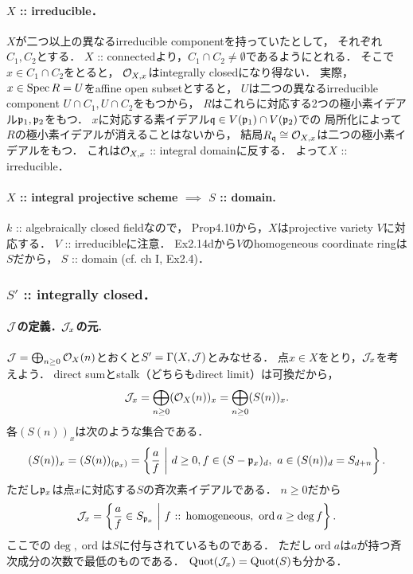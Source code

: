 \documentclass[a4paper]{jsarticle}
\newcommand{\ord}{\operatorname{ord}}
\begin{document}
    \paragraph{$X$ :: irreducible．}
    $X$が二つ以上の異なるirreducible componentを持っていたとして，
    それぞれ$C_1, C_2$とする．
    $X$ :: connectedより，$C_1 \cap C_2 \neq \emptyset$であるようにとれる．
    そこで$x \in C_1 \cap C_2$をとると，
    $\mathcal{O}_{X,x}$はintegrally closedになり得ない．
    実際，
    $x \in \operatorname{Spec} R=U$をaffine open subsetとすると，
    $U$は二つの異なるirreducible component $U \cap C_1, U \cap C_2$をもつから，
    $R$はこれらに対応する2つの極小素イデアル$\mathfrak{p}_1, \mathfrak{p}_2$をもつ．
    $x$に対応する素イデアル$\mathfrak{q} \in V(\mathfrak{p}_1) \cap V(\mathfrak{p}_2)$での
    局所化によって$R$の極小素イデアルが消えることはないから，
    結局$R_{\mathfrak{q}} \cong \mathcal{O}_{X,x}$は二つの極小素イデアルをもつ．
    これは$\mathcal{O}_{X,x}$ :: integral domainに反する．
    よって$X$ :: irreducible．

    \paragraph{$X$ :: integral projective scheme $\implies$ $S$ :: domain.}
    $k$ :: algebraically closed fieldなので，
    Prop4.10から，$X$はprojective variety $V$に対応する．
    $V$ :: irreducibleに注意．
    Ex2.14dから$V$のhomogeneous coordinate ringは$S$だから，
    $S$ :: domain (cf. ch I, Ex2.4)．

    \subsubsection{$S'$ :: integrally closed．}

    \paragraph{$\mathcal{J}$の定義．$\mathcal{J}_x$の元.}
    $\mathcal{J}=\bigoplus_{n \geq 0} \mathcal{O}_X(n)$とおくと$S'=\Gamma(X,\mathcal{J})$とみなせる．
    点$x \in X$をとり，$\mathcal{J}_x$を考えよう．
    direct sumとstalk（どちらもdirect limit）は可換だから，
    \[ \mathcal{J}_x=\bigoplus_{n \geq 0} (\mathcal{O}_X(n))_x=\bigoplus_{n \geq 0} (S(n))_x. \]
    各$(S(n))_x$は次のような集合である．
    \[
        (S(n))_x=
        (S(n))_{(\mathfrak{p}_x)}=
        \left\{ \frac{a}{f} ~\middle|~ d \geq 0, f \in (S-\mathfrak{p}_x)_d,~ a \in (S(n))_{d}=S_{d+n} \right\}.
    \]
    ただし$\mathfrak{p}_x$は点$x$に対応する$S$の斉次素イデアルである．
    $n \geq 0$だから
    \[ \shJ_x=\left\{ \frac{a}{f} \in S_{\I{p}_x}~\middle|~ f\text{ :: homogeneous},~ \ord a \geq \deg f \right\}. \]
    ここでの$\deg,\ord$は$S$に付与されているものである．
    ただし$\ord a$は$a$が持つ斉次成分の次数で最低のものである．
    $\operatorname{Quot}(\mathcal{J}_x)=\operatorname{Quot}(S)$も分かる．
\end{document}
